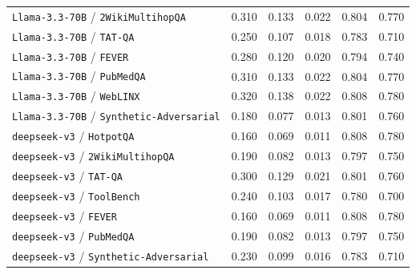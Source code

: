 \begin{longtable}{lccccc}
\texttt{Llama-3.3-70B} / \texttt{2WikiMultihopQA} & 0.310 & 0.133 & 0.022 & 0.804 & 0.770 \\
\texttt{Llama-3.3-70B} / \texttt{TAT-QA} & 0.250 & 0.107 & 0.018 & 0.783 & 0.710 \\
\texttt{Llama-3.3-70B} / \texttt{FEVER} & 0.280 & 0.120 & 0.020 & 0.794 & 0.740 \\
\texttt{Llama-3.3-70B} / \texttt{PubMedQA} & 0.310 & 0.133 & 0.022 & 0.804 & 0.770 \\
\texttt{Llama-3.3-70B} / \texttt{WebLINX} & 0.320 & 0.138 & 0.022 & 0.808 & 0.780 \\
\texttt{Llama-3.3-70B} / \texttt{Synthetic-Adversarial} & 0.180 & 0.077 & 0.013 & 0.801 & 0.760 \\
\texttt{deepseek-v3} / \texttt{HotpotQA} & 0.160 & 0.069 & 0.011 & 0.808 & 0.780 \\
\texttt{deepseek-v3} / \texttt{2WikiMultihopQA} & 0.190 & 0.082 & 0.013 & 0.797 & 0.750 \\
\texttt{deepseek-v3} / \texttt{TAT-QA} & 0.300 & 0.129 & 0.021 & 0.801 & 0.760 \\
\texttt{deepseek-v3} / \texttt{ToolBench} & 0.240 & 0.103 & 0.017 & 0.780 & 0.700 \\
\texttt{deepseek-v3} / \texttt{FEVER} & 0.160 & 0.069 & 0.011 & 0.808 & 0.780 \\
\texttt{deepseek-v3} / \texttt{PubMedQA} & 0.190 & 0.082 & 0.013 & 0.797 & 0.750 \\
\texttt{deepseek-v3} / \texttt{Synthetic-Adversarial} & 0.230 & 0.099 & 0.016 & 0.783 & 0.710 \\
\bottomrule
\end{longtable}
